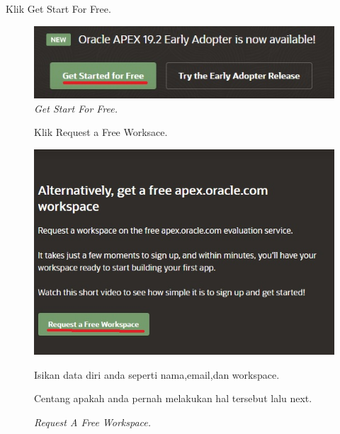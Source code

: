 \begin{enumerate}
\item[1]Klik Get Start For Free.

\begin{figure}[!htbp]
    \begin{center}
    \includegraphics[scale=0.7]{figures/start.jpg}
    \caption{\textit{Get Start For Free.}}
    \end{center}   
    \end{figure}
    
\begin{figure}[!htbp]
\item[2]Klik Request a Free Worksace.

    \begin{center}
    \includegraphics[scale=0.5]{figures/request_wspace.jpg}
    \caption{\textit{Request A Free Workspace.}}
    \end{center}

\item[3]Isikan data diri anda seperti nama,email,dan workspace.


        
\item[4]Centang apakah anda pernah melakukan hal tersebut lalu next.  


\end{figure}
\end{enumerate}
